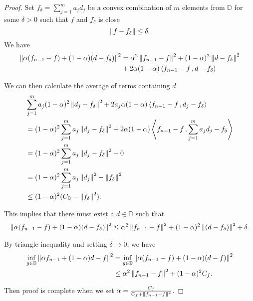 \begin{proof}

     Set $f_{\delta} = \sum_{j=1}^m a_j d_j$ be a convex combination of $m$
    elements from $\mathbb{D}$ for some $\delta > 0$ such that $f$ and
    $f_{\delta}$ is close
    \begin{equation}
        \left\| f - f_{\delta} \right\| \leq \delta.
    \end{equation}
    We have
    \begin{align}
        \left\| \alpha (f_{n-1} - f) + (1-\alpha) (d - f_{\delta}) \right\|^2
        &= \alpha^2 \left\| f_{n-1} - f \right\|^2 + (1-\alpha)^2 \left\| d - f_{\delta} \right\|^2 \\
        &+ 2 \alpha (1-\alpha) \left\langle f_{n-1}-f\, , d - f_{\delta} \right\rangle
    \end{align}

    We can then calculate the average of terms containing $d$
    \begin{align}
        &\sum_{j=1}^m a_j (1-\alpha)^2 \left\| d_j - f_{\delta} \right\|^2 + 
        2 a_j \alpha (1-\alpha) \left\langle f_{n-1}-f\, , d_j - f_{\delta} \right\rangle \\
        &= (1-\alpha)^2 \sum_{j=1}^m a_j \left\| d_j - f_{\delta} \right\|^2 
        + 2 \alpha (1-\alpha) \left\langle f_{n-1}-f\, , \sum_{j=1}^m a_j d_j - f_{\delta} \right\rangle\\
        &= (1-\alpha)^2 \sum_{j=1}^m a_j \left\| d_j - f_{\delta} \right\|^2 + 0 \\
        &= (1-\alpha)^2 \sum_{j=1}^m a_j \left\| d_j \right\|^2 - \left\| f_{\delta} \right\|^2 \\
        &\leq (1-\alpha)^2 (C_{\mathbb{D}} - \left\| f_{\delta} \right\|^2).
    \end{align}

    This implies that there must exist a $d \in \mathbb{D}$ such that
    \begin{align}
        \left\| \alpha (f_{n-1} - f) + (1-\alpha) (d - f_{\delta}) \right\|^2
        \leq \alpha^2 \left\| f_{n-1} - f \right\|^2 + 
        (1-\alpha)^2 \left\| (d - f_{\delta}) \right\|^2 + \delta.
    \end{align}

    By triangle inequality and setting $\delta \to 0$, we have
    \begin{align}
        \inf_{g\in \mathbb{D}} \left\| \alpha f_{n-1} + (1-\alpha) d - f \right\|^2
        &= \inf_{g\in \mathbb{D}} \left\| \alpha (f_{n-1} - f) + (1-\alpha) (d - f) \right\|^2 \\
        &\leq \alpha^2 \left\| f_{n-1} - f \right\|^2 + (1-\alpha)^2 C_f.
    \end{align}

    Then proof is complete when we set $\alpha = \frac{C_f}{C_f + \left\| f_{n-1}
    - f \right\|^2}$.
\end{proof}

